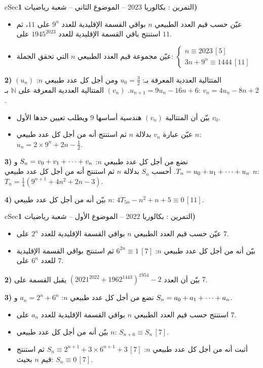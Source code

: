 \documentclass[12pt,a4paper]{article}
\newenvironment{BOX}[2]{\begin{otherlanguage}{english}\begin{arbox}{#1}{#2}}{\end{arbox}\end{otherlanguage}}
\newcounter{exo}
\newenvironment{tamrin}[1]{\stepcounter{exo}\begin{BOX}{cSec}{التمرين \theexo: #1}}{\end{BOX}}
\renewcommand{\cdots}{\mathinner{\cdotp\cdotp\cdotp}}
\newcommand{\N}{\mathbb{N}}
\newenvironment{sq}{\begin{itemize}[leftmargin=2.4em,itemsep=3pt]}{\end{itemize}}
\newcommand{\qa}{\item[(أ)]}\newcommand{\qb}{\item[(ب)]}\newcommand{\qc}{\item[(جـ)]}\newcommand{\qd}{\item[(د)]}\newcommand{\qe}{\item[(هـ)]}
\begin{document}
\begin{tamrin}{بكالوريا 2023 -- الموضوع الثاني -- شعبة رياضيات}
\textbf{1)}
\begin{sq}
\qa عيّن حسب قيم العدد الطبيعي $n$ بواقي القسمة الإقليدية للعدد $9^n$ على $11$، ثم استنتج باقي القسمة الإقليدية للعدد $1945^{2023}$ على $11$.
\qb عيّن مجموعة قيم العدد الطبيعي $n$ التي تحقق الجملة:
$\begin{cases}n\equiv2023\,[5]\\ 3n+9^n\equiv1444\,[11]\end{cases}$
\end{sq}
\textbf{2)} $(u_n)$ المتتالية العددية المعرفة بـ: $u_0=\frac32$ ومن أجل كل عدد طبيعي $n$: $u_{n+1}=9u_n-16n+6$.
$(v_n)$ المتتالية العددية المعرفة على $\N$ بـ: $v_n=4u_n-8n+2$.
\begin{sq}
\qa بيّن أن المتتالية $(v_n)$ هندسية أساسها $9$ ويطلب تعيين حدها الأول $v_0$.
\qb عيّن عبارة $v_n$ بدلالة $n$ ثم استنتج أنه من أجل كل عدد طبيعي $n$: $u_n=2\times9^n+2n-\frac12$.
\end{sq}
\textbf{3)} نضع من أجل كل عدد طبيعي $n$: $S_n=v_0+v_1+\cdots+v_n$ و $T_n=u_0+u_1+\cdots+u_n$.
أحسب $S_n$ بدلالة $n$ ثم استنتج أنه من أجل كل عدد طبيعي $n$: $T_n=\frac14\left(9^{n+1}+4n^2+2n-3\right)$.

\textbf{4)} بيّن أنه من أجل كل عدد طبيعي $n$: $4T_{5n}-n^2+n+5\equiv0\,[11]$.
\end{tamrin}

\begin{tamrin}{بكالوريا 2022 -- الموضوع الأول -- شعبة رياضيات}
\textbf{1)}
\begin{sq}
\qa عيّن حسب قيم العدد الطبيعي $n$ بواقي القسمة الإقليدية للعدد $2^n$ على $7$.
\qb بيّن أنه من أجل كل عدد طبيعي $n$: $6^{2n}\equiv1\,[7]$ ثم استنتج بواقي القسمة الإقليدية للعدد $6^n$ على $7$.
\end{sq}
\textbf{2)} بيّن أن العدد $\left(2021^{2022}+1962^{1443}\right)^{1954}-2$ يقبل القسمة على $7$.

\textbf{3)} نضع من أجل كل عدد طبيعي $n$: $a_n=2^n+6^n$ و $S_n=a_0+a_1+\cdots+a_n$.
\begin{sq}
\qa استنتج حسب قيم العدد الطبيعي $n$ بواقي القسمة الإقليدية للعدد $a_n$ على $7$.
\qb بيّن أنه من أجل كل عدد طبيعي $n$: $S_{n+6}\equiv S_n\,[7]$.
\qc أثبت أنه من أجل كل عدد طبيعي $n$: $S_n\equiv2^{n+1}+3\times6^{n+1}+3\,[7]$ ثم استنتج قيم $n$ بحيث: $S_n\equiv0\,[7]$.
\end{sq}
\end{tamrin}
\end{document}
